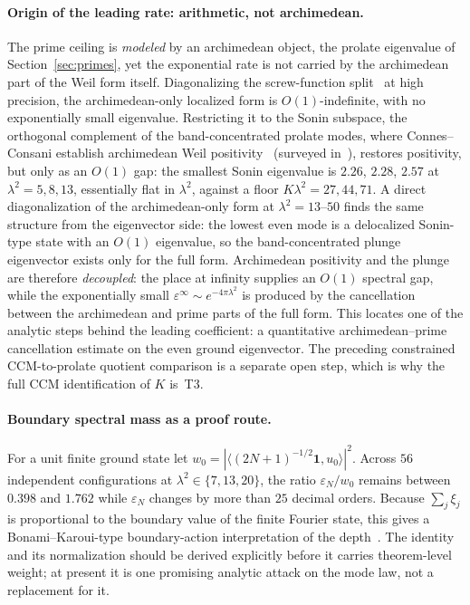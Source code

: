 \documentclass[11pt,a4paper]{article}
\begin{document}
\paragraph{Origin of the leading rate: arithmetic, not archimedean.}
The prime ceiling is \emph{modeled} by an archimedean object, the prolate
eigenvalue of Section~\ref{sec:primes}, yet the exponential rate is not carried
by the archimedean part of the Weil form itself. Diagonalizing the
screw-function split~\cite{Suzuki2026} at high precision, the archimedean-only
localized form is $O(1)$-indefinite, with no exponentially small eigenvalue.
Restricting it to the Sonin subspace, the orthogonal complement of the
band-concentrated prolate modes, where Connes--Consani establish archimedean Weil
positivity~\cite{ConnesConsaniSelecta} (surveyed in~\cite{Connes2026}),
restores positivity, but only as an $O(1)$ gap:
the smallest Sonin eigenvalue is $2.26$, $2.28$, $2.57$ at $\lambda^2=5,8,13$,
essentially flat in $\lambda^2$, against a floor $K\lambda^2=27,44,71$. A
direct diagonalization of the archimedean-only form at $\lambda^2=13$--$50$
finds the same structure from the eigenvector side: the lowest even mode is a
delocalized Sonin-type state with an $O(1)$ eigenvalue, so the
band-concentrated plunge eigenvector exists only for the full form.
Archimedean positivity and the plunge are therefore \emph{decoupled}: the place
at infinity supplies an $O(1)$ spectral gap, while the exponentially small
$\varepsilon^\infty\sim e^{-4\pi\lambda^2}$ is produced by the cancellation
between the archimedean and prime parts of the full form. This locates one of the
analytic steps behind the leading coefficient: a quantitative
archimedean--prime cancellation estimate on the even ground eigenvector. The
preceding constrained CCM-to-prolate quotient comparison is a separate open
step, which is why the full CCM identification of $K$ is~T3.

\paragraph{Boundary spectral mass as a proof route.}
For a unit finite ground state let
$w_0=|\langle(2N+1)^{-1/2}\mathbf1,u_0\rangle|^2$. Across $56$ independent
configurations at $\lambda^2\in\{7,13,20\}$, the ratio
$\varepsilon_N/w_0$ remains between $0.398$ and $1.762$ while
$\varepsilon_N$ changes by more than $25$ decimal orders. Because
$\sum_j\xi_j$ is proportional to the boundary value of the finite Fourier
state, this gives a Bonami--Karoui-type boundary-action interpretation of the
depth~\cite{BonamiKaroui2017}. The identity and its normalization should be
derived explicitly before it carries theorem-level weight; at present it is
one promising analytic attack on the mode law, not a replacement for it.
\end{document}
